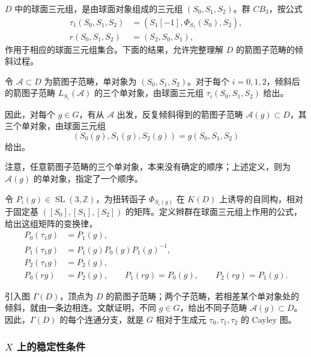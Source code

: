 $D$ 中的球面三元组，是由球面对象组成的三元组 $(S_0,S_1,S_2)$。群 $CB_3$，按公式
\[
\begin{aligned}
\tau_1(S_0,S_1,S_2)&=(S_1[-1],\Phi_{S_1}(S_0),S_2),\\
r(S_0,S_1,S_2)&=(S_2,S_0,S_1),
\end{aligned}
\]
作用于相应的球面三元组集合。下面的结果，允许完整理解 $D$ 的箭图子范畴的倾斜过程。
\begin{proposition}\label{prop:5.44}
令 $\mathcal{A}\subset D$ 为箭图子范畴，单对象为 $(S_0,S_1,S_2)$。对于每个 $i=0,1,2$，倾斜后的箭图子范畴 $L_{S_i}(\mathcal{A})$ 的三个单对象，由球面三元组 $\tau_i(S_0,S_1,S_2)$ 给出。
\end{proposition}

因此，对每个 $g\in G$，有从 $\mathcal{A}$ 出发，反复倾斜得到的箭图子范畴 $\mathcal{A}(g)\subset D$，其三个单对象，由球面三元组
\[
(S_0(g),S_1(g),S_2(g))=g(S_0,S_1,S_2)
\]
给出。

注意，任意箭图子范畴的三个单对象，本来没有确定的顺序；上述定义，则为 $\mathcal{A}(g)$ 的单对象，指定了一个顺序。

令 $P_i(g)\in\operatorname{SL}(3,\mathbb{Z})$，为扭转函子 $\Phi_{S_i(g)}$ 在 $K(D)$ 上诱导的自同构，相对于固定基 $([S_0],[S_1],[S_2])$ 的矩阵。定义辫群在球面三元组上作用的公式，给出这组矩阵的变换律，
\[
\begin{aligned}
P_0(\tau_1g)&=P_1(g),\\
P_1(\tau_1g)&=P_1(g)P_0(g)P_1(g)^{-1},\\
P_2(\tau_1g)&=P_2(g),\\[3pt]
P_0(rg)&=P_2(g),\qquad
P_1(rg)=P_0(g),\qquad P_2(rg)=P_1(g).
\end{aligned}
\]

引入图 $\Gamma(D)$，顶点为 $D$ 的箭图子范畴；两个子范畴，若相差某个单对象处的倾斜，就由一条边相连。文献证明，不同 $g\in G$，给出不同子范畴 $\mathcal{A}(g)\subset D$。因此，$\Gamma(D)$ 的每个连通分支，就是 $G$ 相对于生成元 $\tau_0,\tau_1,\tau_2$ 的 Cayley 图。

\subsubsection{\texorpdfstring{$X$}{X} 上的稳定性条件}\label{sec:5.8.3.3}

